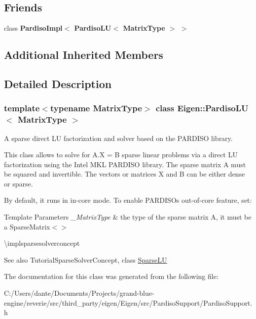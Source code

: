 \subsection*{Friends}
\begin{DoxyCompactItemize}
\item 
\mbox{\label{class_eigen_1_1_pardiso_l_u_ac6b89366233dede3acb259c751a4006a}} 
class {\bfseries Pardiso\+Impl$<$ Pardiso\+L\+U$<$ Matrix\+Type $>$ $>$}
\end{DoxyCompactItemize}
\subsection*{Additional Inherited Members}


\subsection{Detailed Description}
\subsubsection*{template$<$typename Matrix\+Type$>$\newline
class Eigen\+::\+Pardiso\+L\+U$<$ Matrix\+Type $>$}

A sparse direct LU factorization and solver based on the P\+A\+R\+D\+I\+SO library. 

This class allows to solve for A.\+X = B sparse linear problems via a direct LU factorization using the Intel M\+KL P\+A\+R\+D\+I\+SO library. The sparse matrix A must be squared and invertible. The vectors or matrices X and B can be either dense or sparse.

By default, it runs in in-\/core mode. To enable P\+A\+R\+D\+I\+SO\textquotesingle{}s out-\/of-\/core feature, set\+: 
\begin{DoxyCode}{0}
\end{DoxyCode}



\begin{DoxyTemplParams}{Template Parameters}
{\em \+\_\+\+Matrix\+Type} & the type of the sparse matrix A, it must be a Sparse\+Matrix$<$$>$\\
\hline
\end{DoxyTemplParams}
\textbackslash{}implsparsesolverconcept

\begin{DoxySeeAlso}{See also}
Tutorial\+Sparse\+Solver\+Concept, class \mbox{\hyperlink{class_eigen_1_1_sparse_l_u}{Sparse\+LU}} 
\end{DoxySeeAlso}


The documentation for this class was generated from the following file\+:\begin{DoxyCompactItemize}
\item 
C\+:/\+Users/dante/\+Documents/\+Projects/grand-\/blue-\/engine/reverie/src/third\+\_\+party/eigen/\+Eigen/src/\+Pardiso\+Support/Pardiso\+Support.\+h\end{DoxyCompactItemize}
